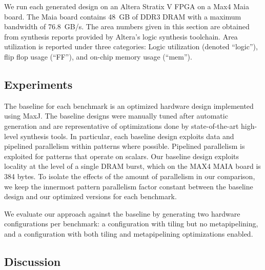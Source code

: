 We run each generated design on an Altera Stratix V FPGA on a Max4 Maia board.
The Maia board contains 48~GB of DDR3 DRAM with a maximum bandwidth of 76.8~GB/s.
The area numbers given in this section are obtained from synthesis reports provided by Altera's logic synthesis toolchain.
Area utilization is reported under three categories: Logic utilization (denoted ``logic''), flip flop usage (``FF''), and on-chip memory usage (``mem'').




\subsection{Experiments}
The baseline for each benchmark is an optimized hardware design implemented using MaxJ.
The baseline designs were manually tuned after automatic generation and are
representative of optimizations done by state-of-the-art high-level synthesis tools.
In particular, each baseline design exploits data and pipelined parallelism within patterns where possible.
Pipelined parallelism is exploited for patterns that operate on scalars. Our baseline design
exploits locality at the level of a single DRAM burst, which on the MAX4 MAIA board is 384 bytes.
To isolate the effects of the amount of parallelism in our comparison, we keep
the innermost pattern parallelism factor constant between the baseline design and our optimized versions for each benchmark.


We evaluate our approach against the baseline by generating two hardware configurations per benchmark:
a configuration with tiling but no metapipelining, and a configuration with both tiling and metapipelining optimizations enabled.

\subsection{Discussion}

